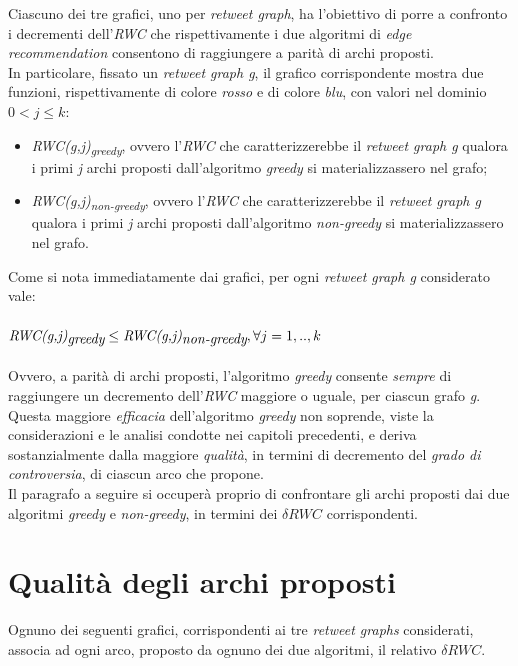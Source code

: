 


Ciascuno dei tre grafici, uno per \textit{retweet graph}, ha l'obiettivo di porre a confronto i decrementi dell'\textit{RWC} che rispettivamente i due algoritmi di \textit{edge recommendation} consentono di raggiungere a parità di archi proposti. 
\\In particolare, fissato un \textit{retweet graph g}, il grafico corrispondente mostra due funzioni, rispettivamente di colore \textit{rosso} e di colore \textit{blu}, con valori nel dominio \textit{$0 < j \leq k$}:
\begin{itemize}
\item \textit{RWC(g,j)\textsubscript{greedy}}, ovvero l'\textit{RWC} che caratterizzerebbe il \textit{retweet graph g} qualora i primi \textit{j} archi proposti dall'algoritmo \textit{greedy} si materializzassero nel grafo; 
\item \textit{RWC(g,j)\textsubscript{non-greedy}}, ovvero l'\textit{RWC} che caratterizzerebbe il \textit{retweet graph g} qualora i primi \textit{j} archi proposti dall'algoritmo \textit{non-greedy} si materializzassero nel grafo.
\end{itemize}
Come si nota immediatamente dai grafici, per ogni \textit{retweet graph g} considerato vale:
\\\\
$\textit{RWC(g,j)\textsubscript{greedy}} \leq \textit{RWC(g,j)\textsubscript{non-greedy}}, \forall j = 1,..,k$
\\\\
Ovvero, a parità di archi proposti, l'algoritmo \textit{greedy} consente \textit{sempre} di raggiungere un decremento dell'\textit{RWC} maggiore o uguale, per ciascun grafo \textit{g}. Questa maggiore \textit{efficacia} dell'algoritmo \textit{greedy} non soprende, viste la considerazioni e le analisi condotte nei capitoli precedenti, e deriva sostanzialmente dalla maggiore \textit{qualità}, in termini di decremento del \textit{grado di controversia}, di ciascun arco che propone. 
\\Il paragrafo a seguire si occuperà proprio di confrontare gli archi proposti dai due algoritmi \textit{greedy} e \textit{non-greedy}, in termini dei \textit{$\delta RWC$} corrispondenti.

\section{Qualità degli archi proposti}
Ognuno dei seguenti grafici, corrispondenti ai tre \textit{retweet graphs} considerati, associa ad ogni arco, proposto da ognuno dei due algoritmi, il relativo \textit{$\delta RWC$}.

